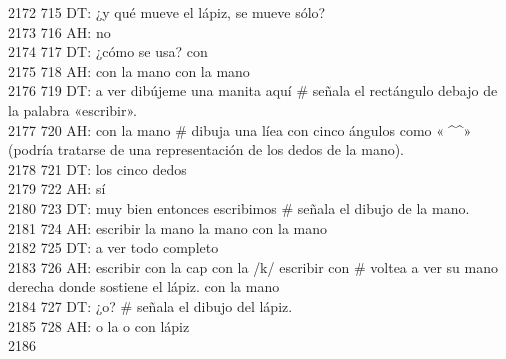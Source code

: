2172 715 DT: ¿y qué mueve el lápiz, se mueve sólo?\\
2173 716 AH: no\\
2174 717 DT: ¿cómo se usa? con\\
2175 718 AH: con la mano con la mano\\
2176 719 DT: a ver dibújeme una manita aquí # señala el rectángulo debajo de la palabra «escribir».\\
2177 720 AH: con la mano # dibuja una líea con cinco ángulos como «^^^^^» (podría tratarse de una representación de los dedos de la mano).\\
2178 721 DT: los cinco dedos\\
2179 722 AH: sí\\
2180 723 DT: muy bien entonces escribimos # señala el dibujo de la mano.\\
2181 724 AH: escribir la mano la mano con la mano\\
2182 725 DT: a ver todo completo\\
2183 726 AH: escribir con la cap con la /k/ escribir con # voltea a ver su mano derecha donde sostiene el lápiz. con la mano\\
2184 727 DT: ¿o? # señala el dibujo del lápiz.\\
2185 728 AH: o la o con lápiz\\
2186 \\
